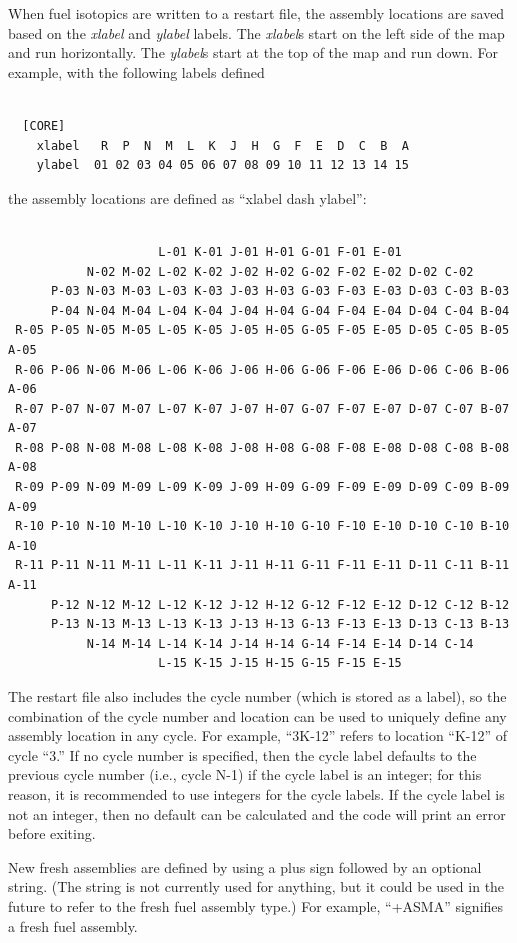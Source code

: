 When fuel isotopics are written to a restart file, the assembly locations are saved
based on the {\it xlabel} and {\it ylabel} labels.
The {\it xlabel}s start on the left side of the map and run horizontally.
The {\it ylabel}s start at the top of the map and run down.
For example, with the following labels defined
\begin{Verbatim}[fontsize=\small]

  [CORE]
    xlabel   R  P  N  M  L  K  J  H  G  F  E  D  C  B  A
    ylabel  01 02 03 04 05 06 07 08 09 10 11 12 13 14 15

\end{Verbatim}
the assembly locations are defined as ``xlabel dash ylabel'':
\begin{Verbatim}[fontsize=\small]

                     L-01 K-01 J-01 H-01 G-01 F-01 E-01
           N-02 M-02 L-02 K-02 J-02 H-02 G-02 F-02 E-02 D-02 C-02
      P-03 N-03 M-03 L-03 K-03 J-03 H-03 G-03 F-03 E-03 D-03 C-03 B-03
      P-04 N-04 M-04 L-04 K-04 J-04 H-04 G-04 F-04 E-04 D-04 C-04 B-04
 R-05 P-05 N-05 M-05 L-05 K-05 J-05 H-05 G-05 F-05 E-05 D-05 C-05 B-05 A-05
 R-06 P-06 N-06 M-06 L-06 K-06 J-06 H-06 G-06 F-06 E-06 D-06 C-06 B-06 A-06
 R-07 P-07 N-07 M-07 L-07 K-07 J-07 H-07 G-07 F-07 E-07 D-07 C-07 B-07 A-07
 R-08 P-08 N-08 M-08 L-08 K-08 J-08 H-08 G-08 F-08 E-08 D-08 C-08 B-08 A-08
 R-09 P-09 N-09 M-09 L-09 K-09 J-09 H-09 G-09 F-09 E-09 D-09 C-09 B-09 A-09
 R-10 P-10 N-10 M-10 L-10 K-10 J-10 H-10 G-10 F-10 E-10 D-10 C-10 B-10 A-10
 R-11 P-11 N-11 M-11 L-11 K-11 J-11 H-11 G-11 F-11 E-11 D-11 C-11 B-11 A-11
      P-12 N-12 M-12 L-12 K-12 J-12 H-12 G-12 F-12 E-12 D-12 C-12 B-12
      P-13 N-13 M-13 L-13 K-13 J-13 H-13 G-13 F-13 E-13 D-13 C-13 B-13
           N-14 M-14 L-14 K-14 J-14 H-14 G-14 F-14 E-14 D-14 C-14
                     L-15 K-15 J-15 H-15 G-15 F-15 E-15
\end{Verbatim}
The restart file also includes the cycle number (which is stored as a label),
so the combination of the cycle number and location can be used to uniquely define any assembly location in any cycle.
For example, ``3K-12'' refers to location ``K-12'' of cycle ``3.''
If no cycle number is specified, then the cycle label defaults to the previous cycle number (i.e., cycle N-1) if the
cycle label is an integer; for this reason, it is recommended to use integers for the cycle labels. If the cycle label
is not an integer, then no default can be calculated and the code will print an error before exiting.

New fresh assemblies are defined by using a plus sign followed by an optional string.
(The string is not currently used for anything, but it could be used in the future to refer to the fresh fuel assembly type.)
For example, ``+ASMA'' signifies a fresh fuel assembly.

